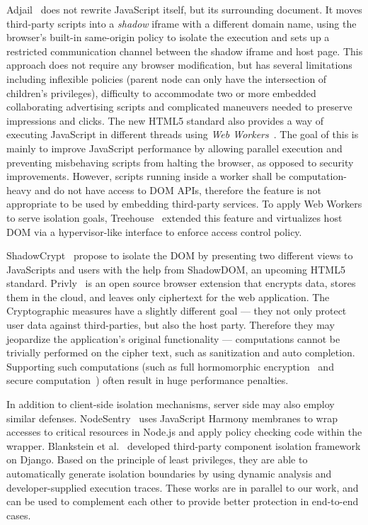 Adjail~\cite{Adjail} does not rewrite JavaScript itself, but its surrounding document.  It moves third-party scripts into a \emph{shadow} iframe with a different domain name, using the browser's built-in same-origin policy to isolate the execution and sets up a restricted communication channel between the shadow iframe and host page.  This approach does not require any browser modification, but has several limitations including inflexible policies (parent node can only have the intersection of children's privileges), difficulty to accommodate two or more embedded collaborating advertising scripts and complicated maneuvers needed to preserve impressions and clicks.  The new HTML5 standard also provides a way of executing JavaScript in different threads using \emph{Web Workers}~\cite{WebWorkers}.  The goal of this is mainly to improve JavaScript performance by allowing parallel execution and preventing misbehaving scripts from halting the browser, as opposed to security improvements.  However, scripts running inside a worker shall be computation-heavy and do not have access to DOM APIs, therefore the feature is not appropriate to be used by embedding third-party services.  To apply Web Workers to serve isolation goals, Treehouse\footnotemark[1]~\cite{Treehouse} extended this feature and virtualizes host DOM via a hypervisor-like interface to enforce access control policy.  


 ShadowCrypt\footnotemark[1]~\cite{ShadowCrypt} propose to isolate the DOM by presenting two different views to JavaScripts and users with the help from ShadowDOM, an upcoming HTML5 standard.  Privly~\cite{Privly} is an open source browser extension that encrypts data, stores them in the cloud, and leaves only ciphertext for the web application.  The Cryptographic measures have a slightly different goal --- they not only protect user data against third-parties, but also the host party.  Therefore they may jeopardize the application's original functionality --- computations cannot be trivially performed on the cipher text, such as sanitization and auto completion.  Supporting such computations (such as full hormomorphic encryption~\cite{homenc} and secure computation~\cite{huang2011faster}) often result in huge performance penalties.

 In addition to client-side isolation mechanisms, server side may also employ similar defenses.  NodeSentry\footnotemark[1]~\cite{NodeSentry} uses JavaScript Harmony membranes to wrap accesses to critical resources in Node.js and apply policy checking code within the wrapper.  Blankstein et al.\footnotemark[1]~\cite{Blankstein} developed third-party component isolation framework on Django.  Based on the principle of least privileges, they are able to automatically generate isolation boundaries by using dynamic analysis and developer-supplied execution traces.  These works are in parallel to our work, and can be used to complement each other to provide better protection in end-to-end cases.

